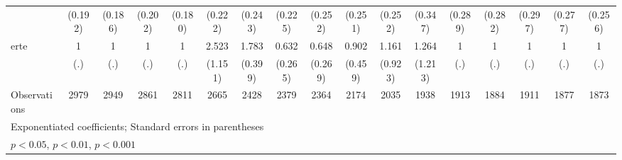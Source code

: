 {\begin{tabular}{l*{16}{c}}
                    &     (0.192)         &     (0.186)         &     (0.202)         &     (0.180)         &     (0.222)         &     (0.243)         &     (0.225)         &     (0.252)         &     (0.251)         &     (0.252)         &     (0.347)         &     (0.289)         &     (0.282)         &     (0.297)         &     (0.277)         &     (0.256)         \\
[1em]
erte                &           1         &           1         &           1         &           1         &       2.523\sym{*}  &       1.783\sym{**} &       0.632         &       0.648         &       0.902         &       1.161         &       1.264         &           1         &           1         &           1         &           1         &           1         \\
                    &         (.)         &         (.)         &         (.)         &         (.)         &     (1.151)         &     (0.399)         &     (0.265)         &     (0.269)         &     (0.459)         &     (0.923)         &     (1.213)         &         (.)         &         (.)         &         (.)         &         (.)         &         (.)         \\
\hline
Observations        &        2979         &        2949         &        2861         &        2811         &        2665         &        2428         &        2379         &        2364         &        2174         &        2035         &        1938         &        1913         &        1884         &        1911         &        1877         &        1873         \\
\hline\hline
\multicolumn{17}{l}{\footnotesize Exponentiated coefficients; Standard errors in parentheses}\\
\multicolumn{17}{l}{\footnotesize \sym{*} \(p<0.05\), \sym{**} \(p<0.01\), \sym{***} \(p<0.001\)}\\
\end{tabular}
}
